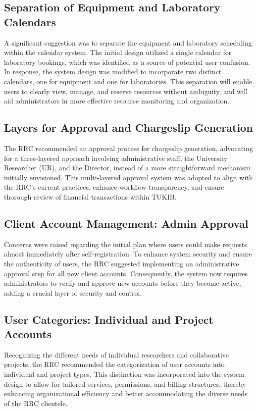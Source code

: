 \subsection{Separation of Equipment and Laboratory Calendars}
A significant suggestion was to separate the equipment and laboratory scheduling within the calendar system. The initial design utilized a single calendar for laboratory bookings, which was identified as a source of potential user confusion. In response, the system design was modified to incorporate two distinct calendars, one for equipment and one for laboratories. This separation will enable users to clearly view, manage, and reserve resources without ambiguity, and will aid administrators in more effective resource monitoring and organization.

\subsection{Layers for Approval and Chargeslip Generation}
The RRC recommended an approval process for chargeslip generation, advocating for a three-layered approach involving administrative staff, the University Researcher (UR), and the Director, instead of a more straightforward mechanism initially envisioned. This multi-layered approval system was adopted to align with the RRC's current practices, enhance workflow transparency, and ensure thorough review of financial transactions within TUKIB.

\subsection{Client Account Management: Admin Approval}
Concerns were raised regarding the initial plan where users could make requests almost immediately after self-registration. To enhance system security and ensure the authenticity of users, the RRC suggested implementing an administrative approval step for all new client accounts. Consequently, the system now requires administrators to verify and approve new accounts before they become active, adding a crucial layer of security and control.

\subsection{User Categories: Individual and Project Accounts}
Recognizing the different needs of individual researchers and collaborative projects, the RRC recommended the categorization of user accounts into individual and project types. This distinction was incorporated into the system design to allow for tailored services, permissions, and billing structures, thereby enhancing organizational efficiency and better accommodating the diverse needs of the RRC clientele.

